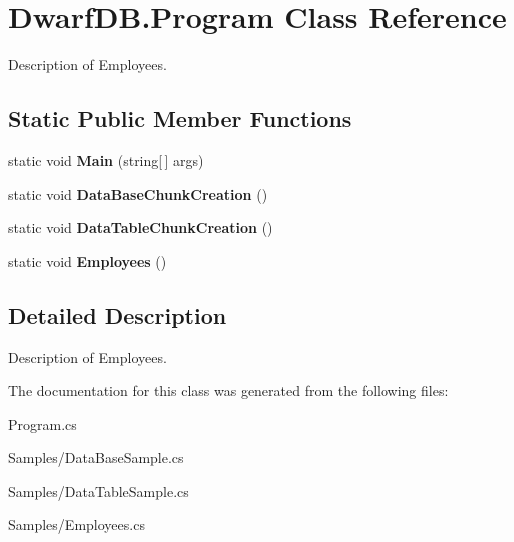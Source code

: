 \hypertarget{class_dwarf_d_b_1_1_program}{\section{Dwarf\+D\+B.\+Program Class Reference}
\label{class_dwarf_d_b_1_1_program}
}


Description of Employees.  


\subsection*{Static Public Member Functions}
\begin{DoxyCompactItemize}
\item 
\hypertarget{class_dwarf_d_b_1_1_program_ad191792c625399b2912062074ad4476b}{static void {\bfseries Main} (string\mbox{[}$\,$\mbox{]} args)}\label{class_dwarf_d_b_1_1_program_ad191792c625399b2912062074ad4476b}

\item 
\hypertarget{class_dwarf_d_b_1_1_program_af6bc5554955f41aa161cd638dd1fcbc1}{static void {\bfseries Data\+Base\+Chunk\+Creation} ()}\label{class_dwarf_d_b_1_1_program_af6bc5554955f41aa161cd638dd1fcbc1}

\item 
\hypertarget{class_dwarf_d_b_1_1_program_abab621dfeced1fb0c770bd5a1dffe3a6}{static void {\bfseries Data\+Table\+Chunk\+Creation} ()}\label{class_dwarf_d_b_1_1_program_abab621dfeced1fb0c770bd5a1dffe3a6}

\item 
\hypertarget{class_dwarf_d_b_1_1_program_a59b46f2c792386b7eaaf5419cd7656a0}{static void {\bfseries Employees} ()}\label{class_dwarf_d_b_1_1_program_a59b46f2c792386b7eaaf5419cd7656a0}

\end{DoxyCompactItemize}


\subsection{Detailed Description}
Description of Employees. 



The documentation for this class was generated from the following files\+:\begin{DoxyCompactItemize}
\item 
Program.\+cs\item 
Samples/Data\+Base\+Sample.\+cs\item 
Samples/Data\+Table\+Sample.\+cs\item 
Samples/Employees.\+cs\end{DoxyCompactItemize}
